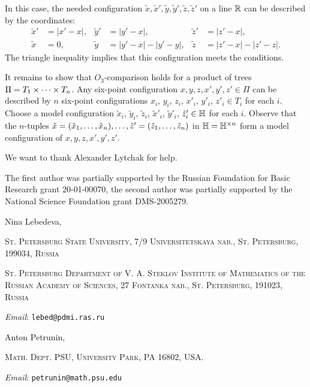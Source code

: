 \documentclass{article}
\makeatletter
\newcommand{\Addresses}{{\bigskip\footnotesize

\noindent Nina Lebedeva,
\par\nopagebreak
 \textsc{St. Petersburg State University, 7/9 Universitetskaya nab., St. Petersburg, 199034, Russia}
\par
\nopagebreak
 \textsc{St. Petersburg Department of V. A. Steklov Institute of Mathematics of the Russian Academy of Sciences, 27 Fontanka nab., St. Petersburg, 191023, Russia}
  \par\nopagebreak
  \textit{Email}: \texttt{lebed@pdmi.ras.ru}

\medskip

\noindent   Anton Petrunin, 
\par\nopagebreak
 \textsc{Math. Dept. PSU, University Park, PA 16802, USA.}
  \par\nopagebreak
  \textit{Email}: \texttt{petrunin@math.psu.edu}
  
}}
\makeatother
\begin{document}
In this case, the needed configuration $\tilde x,\tilde x',\tilde y,\tilde y',\tilde z,\tilde z'$ on a line $\mathbb{R}$ can be described by the coordinates:
\begin{align*}
\tilde x'&=|x'-x|,
&
\tilde y'&=|y'-x|,
&
\tilde z'&=|z'-x|,
\\
\tilde x&=0,
&
\tilde y&=|y'-x|-|y'-y|,
&
\tilde z&=|z'-x|-|z'-z|.
\end{align*}
The triangle inequality implies that this configuration meets the conditions. 

It remains to show that $O_3$-comparison holds for a product of trees $\Pi\z=T_1\times \dots\times T_n$.
Any six-point configuration $x,y,z,x',y',z'\in \Pi$ can be described by $n$ six-point configurations $x_i$, $y_i$, $z_i$, $x'_i$, $y'_i$, $z'_i\in T_i$ for each $i$.
Choose a model configuration $\tilde x_i$, $\tilde y_i$, $\tilde z_i$, $\tilde x'_i$, $\tilde y'_i$, $\tilde z'_i\in \mathbb H$ for each $i$.
Observe that the $n$-tuples $\tilde x=(\tilde x_1,\dots, \tilde x_n),\z\dots,\tilde z'=(\tilde z_1,\dots, \tilde z_n)$ in $\mathbb H=\mathbb H^{\times n}$ form a model configuration of $x,y,z,x',y',z'$.
\qeds

We want to thank Alexander Lytchak for help. 

The first author was partially supported by the Russian Foundation for Basic Research grant 20-01-00070, the second author was partially supported by the National Science Foundation grant DMS-2005279.

{\sloppy
\printbibliography[heading=bibintoc]
\fussy
}

\Addresses
\end{document}
